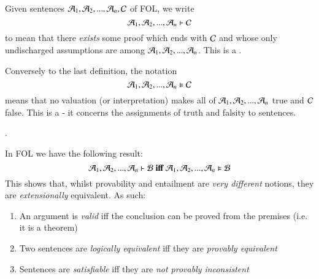 \documentclass[12pt, a4paper, twoside, openright, titlepage]{book}
\begin{document}
\begin{defn}{}{}
    Given sentences $\mathcal{A}_1,\mathcal{A}_2,...,\mathcal{A}_n,\mathcal{C}$ of FOL, we write \begin{equation*}
        \mathcal{A}_1,\mathcal{A}_2,...,\mathcal{A}_n\vdash\mathcal{C}
    \end{equation*}
    to mean that there \emph{exists} some proof which ends with $\mathcal{C}$ and whose only undischarged assumptions are among $\mathcal{A}_1,\mathcal{A}_2,...,\mathcal{A}_n$. This is a .
\end{defn}

\begin{defn}{}{}
    Conversely to the last definition, the notation \begin{equation*}
        \mathcal{A}_1,\mathcal{A}_2,...,\mathcal{A}_n\vDash \mathcal{C}
    \end{equation*}
    means that no valuation (or interpretation) makes all of $\mathcal{A}_1,\mathcal{A}_2,...,\mathcal{A}_n$ true and $\mathcal{C}$ false. This is a  - it concerns the assignments of truth and falsity to sentences.
\end{defn}

.

\begin{thm}{}{}
    In FOL we have the following result: \begin{equation*}
        \mathcal{A}_1,\mathcal{A}_2,...,\mathcal{A}_n\vdash\mathcal{B}\;\textbf{iff}\;\mathcal{A}_1,\mathcal{A}_2,...,\mathcal{A}_n\vDash\mathcal{B}
    \end{equation*}
    This shows that, whilst provability and entailment are \emph{very different} notions, they are \emph{extensionally} equivalent. As such: \begin{enumerate}
        \item An argument is \emph{valid} iff the conclusion can be proved from the premises (i.e. it is a theorem)
        \item Two sentences are \emph{logically equivalent} iff they are \emph{provably equivalent}
        \item Sentences are \emph{satisfiable} iff they are \emph{not provably inconsistent}
    \end{enumerate}
\end{thm}
\end{document}
